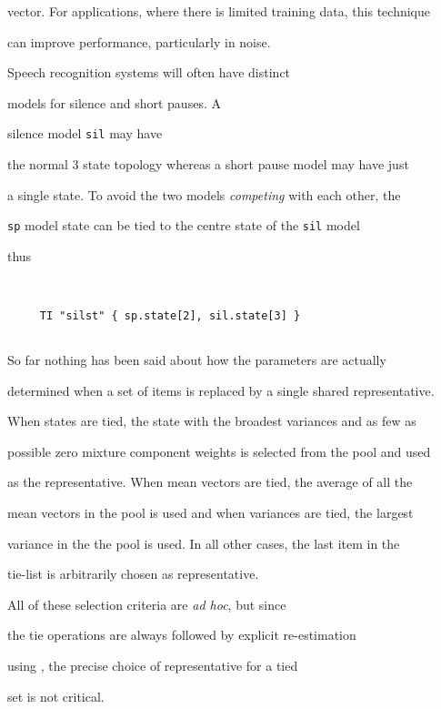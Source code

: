 vector.  For applications, where there is limited training data, this technique


can improve performance, particularly in noise.





Speech recognition systems will often have distinct


models for silence  and short pauses.  A 


silence model \texttt{sil} may have


the normal 3 state topology whereas a short pause model may have just 


a single state.  To avoid the two models \textit{competing} with each other, the


\texttt{sp} model state can be tied to the centre state of the \texttt{sil} model


thus


\begin{verbatim}


     TI "silst" { sp.state[2], sil.state[3] }


\end{verbatim}





So far nothing has been said about how the parameters are actually


determined when a set of items is replaced by a single shared representative.


When states are tied, the state with the broadest  variances  and as few as


possible zero mixture component weights is selected from the pool and used


as the representative.  When mean vectors are tied, the average of all the


mean vectors in the pool is used and when variances are tied, the largest


variance in the the pool is used.  In all other cases, the last item in the


tie-list is  arbitrarily chosen as representative.


All of these selection criteria are \textit{ad hoc}, but since


the tie operations are always followed by explicit re-estimation


using , the precise choice of representative for a tied


set is not critical.





